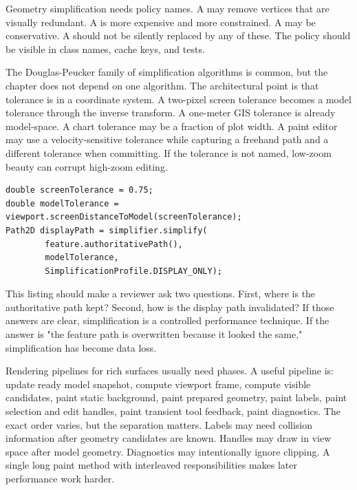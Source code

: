 Geometry simplification needs policy names. A  may remove vertices that are visually redundant. A  is more expensive and more constrained. A  may be conservative. A  should not be silently replaced by any of these. The policy should be visible in class names, cache keys, and tests.

The Douglas-Peucker family of simplification algorithms is common, but the chapter does not depend on one algorithm. The architectural point is that tolerance is in a coordinate system. A two-pixel screen tolerance becomes a model tolerance through the inverse transform. A one-meter GIS tolerance is already model-space. A chart tolerance may be a fraction of plot width. A paint editor may use a velocity-sensitive tolerance while capturing a freehand path and a different tolerance when committing. If the tolerance is not named, low-zoom beauty can corrupt high-zoom editing.

\begin{lstlisting}[caption={Scale-aware simplification as an explicit rendering choice.}]
double screenTolerance = 0.75;
double modelTolerance = viewport.screenDistanceToModel(screenTolerance);
Path2D displayPath = simplifier.simplify(
        feature.authoritativePath(),
        modelTolerance,
        SimplificationProfile.DISPLAY_ONLY);
\end{lstlisting}

This listing should make a reviewer ask two questions. First, where is the authoritative path kept? Second, how is the display path invalidated? If those answers are clear, simplification is a controlled performance technique. If the answer is "the feature path is overwritten because it looked the same," simplification has become data loss.

Rendering pipelines for rich surfaces usually need phases. A useful pipeline is: update ready model snapshot, compute viewport frame, compute visible candidates, paint static background, paint prepared geometry, paint labels, paint selection and edit handles, paint transient tool feedback, paint diagnostics. The exact order varies, but the separation matters. Labels may need collision information after geometry candidates are known. Handles may draw in view space after model geometry. Diagnostics may intentionally ignore clipping. A single long paint method with interleaved responsibilities makes later performance work harder.

